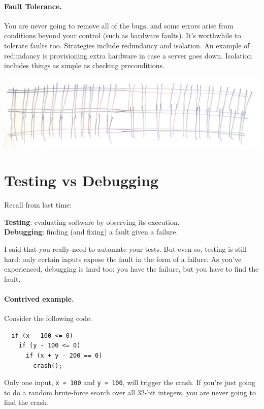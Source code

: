 \documentclass[11pt]{article}
\begin{document}
\paragraph{Fault Tolerance.} You are never going to remove all of the
bugs, and some errors arise from conditions beyond your control
(such as hardware faults). It's worthwhile to tolerate faults too.
Strategies include redundancy and isolation. An example of redundancy
is provisioning extra hardware in case a server goes down. Isolation
includes things as simple as checking preconditions.

\begin{center}
  \includegraphics[width=.7\textwidth]{L02/004_fault_tolerance}
\end{center}


\section*{Testing vs Debugging}
Recall from last time:

{\bf Testing}: evaluating software by observing its execution.\\
{\bf Debugging}: finding (and fixing) a fault given a failure.

I said that you really need to automate your tests. But even so,
testing is still hard: only certain inputs expose the fault in the
form of a failure. As you've experienced, debugging is hard too: you
have the failure, but you have to find the fault.

\paragraph{Contrived example.} Consider the following code:
\begin{lstlisting}
  if (x - 100 <= 0)
    if (y - 100 <= 0)
      if (x + y - 200 == 0)
        crash();
\end{lstlisting}
Only one input, {\tt x = 100} and {\tt y = 100}, will trigger the
crash.  If you're just going to do a random brute-force search over
all 32-bit integers, you are never going to find the crash.
\end{document}

